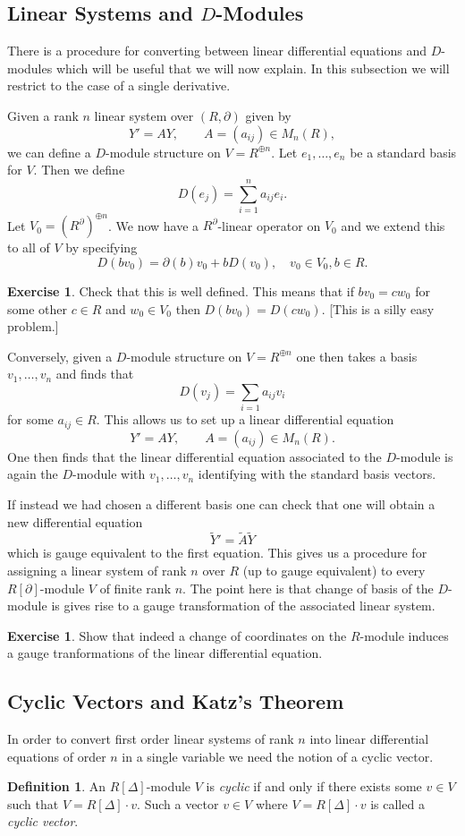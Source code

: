 \documentclass[12pt]{book}
\numberwithin{equation}{section}
\theoremstyle{definition}
\newtheorem{definition}[theorem]{Definition}
\newtheorem{exercise}[theorem]{Exercise}
\theoremstyle{remark}
\begin{document}
\subsection{Linear Systems and $D$-Modules}
There is a procedure for converting between linear differential equations and $D$-modules which will be useful that we will now explain. 
In this subsection we will restrict to the case of a single derivative.

Given a rank $n$ linear system over $(R,\partial)$ given by 
$$ Y' = A Y, \qquad A = (a_{ij}) \in M_n(R), $$
we can define a $D$-module structure on $V=R^{\oplus n}$.
Let $e_1,\ldots,e_n$ be a standard basis for $V$.
Then we define 
$$ D(e_j) = \sum_{i=1}^n a_{ij} e_i.$$
Let $V_0 = (R^{\partial})^{\oplus n}$. 
We now have a $R^{\partial}$-linear operator on $V_0$ and we extend this to all of $V$ by specifying 
$$ D(b v_0) = \partial(b)v_0 + b D(v_0), \quad v_0 \in V_0, b \in R. $$
\begin{exercise}
	Check that this is well defined.
	This means that if $bv_0 = cw_0$ for some other $c \in R$ and $w_0 \in V_0$ then $D(bv_0) = D(cw_0)$. [This is a silly easy problem.]
\end{exercise}

Conversely, given a $D$-module structure on $V = R^{\oplus n}$ one then takes a basis $v_1,\ldots, v_n$ and finds that 
$$ D(v_j) = \sum_{i=1}a_{ij}v_i $$
for some $a_{ij}\in R$. 
This allows us to set up a linear differential equation 
$$ Y' = AY, \qquad A = (a_{ij}) \in M_n(R).$$
One then finds that the linear differential equation associated to the $D$-module is again the $D$-module with $v_1,\ldots,v_n$ identifying with the standard basis vectors. 

If instead we had chosen a different basis one can check that one will obtain a new differential equation
$$ \widetilde{Y}' = \widetilde{A} \widetilde{Y} $$
which is gauge equivalent to the first equation. 
This gives us a procedure for assigning a linear system of rank $n$ over $R$ (up to gauge equivalent) to every $R[\partial]$-module $V$ of finite rank $n$.
The point here is that change of basis of the $D$-module is gives rise to a gauge transformation of the associated linear system.

\begin{exercise}
	Show that indeed a change of coordinates on the $R$-module induces a gauge tranformations of the linear differential equation.
\end{exercise}

\subsection{Cyclic Vectors and Katz's Theorem}
In order to convert first order linear systems of rank $n$ into linear differential equations of  order $n$ in a single variable we need the notion of a cyclic vector. 
\begin{definition}
	An $R[\Delta]$-module $V$ is \emph{cyclic} if and only if there exists some $v \in V$ such that $V = R[\Delta]\cdot v$. 
	Such a vector $v \in V$ where $V = R[\Delta]\cdot v$ is called a \emph{cyclic vector}.
\end{definition}
\end{document}
